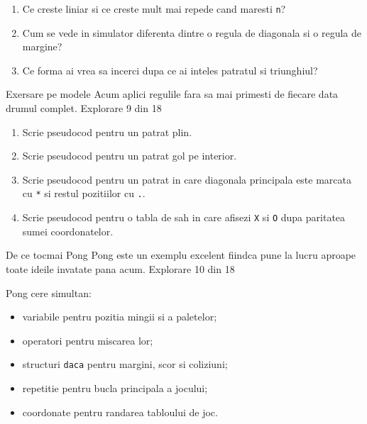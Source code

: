 \begin{semibox}
\begin{enumerate}
\item Ce creste liniar si ce creste mult mai repede cand maresti \texttt{n}?
\item Cum se vede in simulator diferenta dintre o regula de diagonala si o regula de margine?
\item Ce forma ai vrea sa incerci dupa ce ai inteles patratul si triunghiul?
\end{enumerate}
\end{semibox}

\clearpage

\PageHeader
  {Exersare pe modele}
  {Acum aplici regulile fara sa mai primesti de fiecare data drumul complet.}
  {Explorare 9 din 18}

\begin{solobox}
\begin{enumerate}
\item Scrie pseudocod pentru un patrat plin.
\item Scrie pseudocod pentru un patrat gol pe interior.
\item Scrie pseudocod pentru un patrat in care diagonala principala este marcata cu \texttt{*} si restul pozitiilor cu \texttt{.}.
\item Scrie pseudocod pentru o tabla de sah in care afisezi \texttt{X} si \texttt{O} dupa paritatea sumei coordonatelor.
\end{enumerate}
\end{solobox}

\clearpage

\PageHeader
  {De ce tocmai Pong}
  {Pong este un exemplu excelent fiindca pune la lucru aproape toate ideile invatate pana acum.}
  {Explorare 10 din 18}

\begin{missionbox}
Pong cere simultan:
\begin{itemize}
\item variabile pentru pozitia mingii si a paletelor;
\item operatori pentru miscarea lor;
\item structuri \texttt{daca} pentru margini, scor si coliziuni;
\item repetitie pentru bucla principala a jocului;
\item coordonate pentru randarea tabloului de joc.
\end{itemize}
\end{missionbox}

